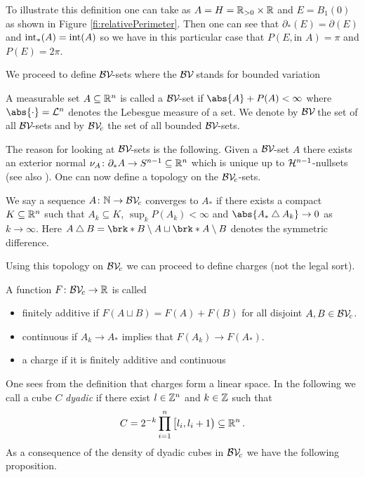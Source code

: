 \noindent To illustrate this definition one can take as $A=H=\mathbb{R}_{>0}\times\mathbb{R}$ and $E=B_1(0)$ as shown in Figure \ref{fi:relativePerimeter}. Then one can see that $\partial_*(E)=\partial (E)$ and $\operatorname{int}_*(A)=\operatorname{int}(A)$ so we have in this particular case that $P(E,\text{in }A)=\pi$ and $P(E)=2\pi$.

We proceed to define $\BV$-sets where the $\BV$ stands for bounded variation

\begin{definition}[$\BV$-sets]
A measurable set $A\subseteq\mathbb{R}^n$ is called a $\BV$-set if $ \abs{A}+P(A)<\infty$ where $\abs{\cdot}=\cL^n$ denotes the Lebesgue measure of a set. We denote by $\BV$ the set of all $\BV$-sets and by $\BV_c$ the set of all bounded $\BV$-sets.
\end{definition}

\noindent The reason for looking at $\BV$-sets is the following. Given a $\BV$-set $A$ there exists an exterior normal $\nu_A\colon\partial_*A\to S^{n-1}\subseteq \mathbb{R}^n$ which is unique up to $\mathcal{H}^{n-1}$-nullsets (see also \cite{Pfe2016}). One can now define a topology on the $\BV_c$-sets.

\begin{definition}[Topology on $\BV_c$]
We say a sequence $A\colon\mathbb{N}\to \mathcal{BV\!}_c$ converges to $A_*$ if there exists a compact $K\subseteq\mathbb{R}^n$ such that $A_k\subseteq K$, $\sup_kP(A_k)<\infty$ and $\abs{A_*\symmDiff A_k}\to0$ as $k\to\infty$. Here $A\symmDiff B=\brk*{B\setminus A}\sqcup \brk*{A\setminus B}$ denotes the symmetric difference.
\end{definition}

\noindent Using this topology on $\BV_c$ we can proceed to define charges (not the legal sort).

\begin{definition}[Charge]
A function $F\colon \mathcal{BV\!}_c\to\mathbb{R}$ is called
\begin{itemize}
	\item finitely additive if $F(A\sqcup B) =F(A)+F(B)$ for all disjoint $A,B\in\mathcal{BV\!}_c$.
	\item continuous if $A_k\to A_*$ implies that $F(A_k)\to F(A_*)$.
	\item a charge if it is finitely additive and continuous
\end{itemize}
\end{definition}

\noindent One sees from the definition that charges form a linear space.
In the following we call a cube $C$ \textit{dyadic} if there exist  $l\in\mathbb{Z}^n$ and $k\in\mathbb{Z}$ such that
\begin{align*}
	C = 2^{-k}\prod_{i=1}^n\big[l_i,l_i+1\big)\subseteq\mathbb{R}^n\,.
\end{align*}
As a consequence of the density of dyadic cubes in $\BV_c$ we have the following proposition.

